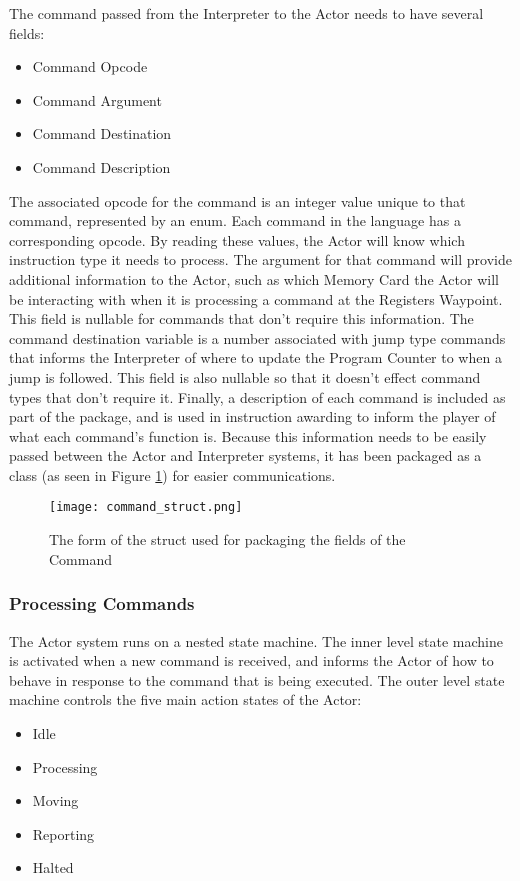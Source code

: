 The command passed from the Interpreter to the Actor needs to have several fields:
\begin{itemize}
	\item Command Opcode
	\item Command Argument
	\item Command Destination
	\item Command Description
\end{itemize}
The associated opcode for the command is an integer value unique to that command, represented by an enum. Each command in the language has a corresponding opcode. By reading these values, the Actor will know which instruction type it needs to process. The argument for that command will provide additional information to the Actor, such as which Memory Card the Actor will be interacting with when it is processing a command at the Registers Waypoint. This field is nullable for commands that don't require this information. The command destination variable is a number associated with jump type commands that informs the Interpreter of where to update the Program Counter to when a jump is followed. This field is also nullable so that it doesn't effect command types that don't require it. Finally, a description of each command is included as part of the package, and is used in instruction awarding to inform the player of what each command's function is. Because this information needs to be easily passed between the Actor and Interpreter systems, it has been packaged as a class (as seen in Figure \ref{fig:command_struct}) for easier communications. \\

\begin{figure}[!htb]
  \caption{The form of the struct used for packaging the fields of the Command}
  \label{fig:command_struct}
  \centering
  \texttt{[image: command\_struct.png]}
\end{figure}

\subsubsection{Processing Commands}
The Actor system runs on a nested state machine. The inner level state machine is activated when a new command is received, and informs the Actor of how to behave in response to the command that is being executed. The outer level state machine controls the five main action states of the Actor:
\begin{itemize}
	\item Idle
	\item Processing
	\item Moving
	\item Reporting
	\item Halted
\end{itemize}

